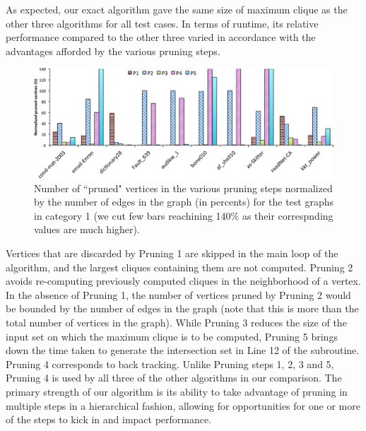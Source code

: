 As expected, our exact algorithm gave the same size of maximum clique as the other
three algorithms for all test cases. 
In terms of runtime,  its relative performance compared to the other three varied
in accordance with the advantages afforded by the various pruning steps.  


\begin{figure}
  \centering
    \includegraphics[scale=0.4]{pruned.eps}
\caption{Number of ``pruned" vertices in the various pruning steps normalized
by the number of edges in the graph (in percents) for the test graphs in category 1 (we cut few bars reachining 140\% as their correspnding values are much higher).}
\label{fig-pruningplot}
\end{figure}

Vertices that are discarded by Pruning 1 are skipped in the main loop of the algorithm, and the largest cliques containing them are not computed. Pruning 2 avoids re-computing previously computed cliques in the neighborhood of a vertex. In the absence of Pruning 1, the number of vertices pruned by Pruning 2 would be bounded by the number of edges in the graph (note that this is more than the total number of vertices in the graph). While Pruning 3 reduces the size of the input set on which the maximum clique is to be computed, Pruning 5 brings down the time taken to generate the intersection set in Line 12 of the subroutine. 
Pruning 4 corresponds to back tracking. Unlike Pruning steps 1, 2, 3 and 5, Pruning 4
is used  by all three of the other algorithms in our comparison. The primary strength of our algorithm is its ability to take advantage of pruning in multiple steps in a hierarchical fashion, allowing for opportunities for one or more of the steps to kick in and impact performance.

